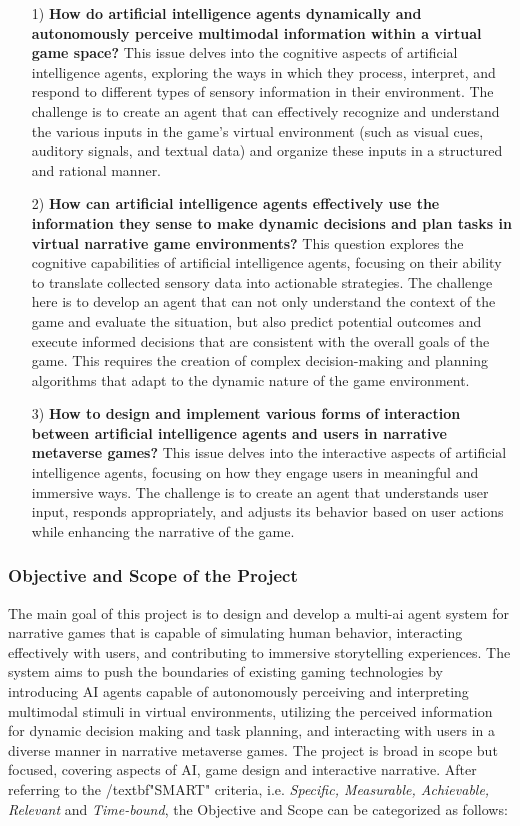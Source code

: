 \begin{itemize}
    \item [1)] 
    \textbf{How do artificial intelligence agents dynamically and autonomously perceive multimodal information within a virtual game space?} 
    This issue delves into the cognitive aspects of artificial intelligence agents, exploring the ways in which they process, interpret, and respond to different types of sensory information in their environment. The challenge is to create an agent that can effectively recognize and understand the various inputs in the game's virtual environment (such as visual cues, auditory signals, and textual data) and organize these inputs in a structured and rational manner.
    \item [2)]
    \textbf{How can artificial intelligence agents effectively use the information they sense to make dynamic decisions and plan tasks in virtual narrative game environments?} 
    This question explores the cognitive capabilities of artificial intelligence agents, focusing on their ability to translate collected sensory data into actionable strategies. The challenge here is to develop an agent that can not only understand the context of the game and evaluate the situation, but also predict potential outcomes and execute informed decisions that are consistent with the overall goals of the game. 
    This requires the creation of complex decision-making and planning algorithms that adapt to the dynamic nature of the game environment.
    \item [3)]
    \textbf{How to design and implement various forms of interaction between artificial intelligence agents and users in narrative metaverse games?} 
    This issue delves into the interactive aspects of artificial intelligence agents, focusing on how they engage users in meaningful and immersive ways. The challenge is to create an agent that understands user input, responds appropriately, and adjusts its behavior based on user actions while enhancing the narrative of the game.
\end{itemize}

\subsubsection{Objective and Scope of the Project}
The main goal of this project is to design and develop a multi-ai agent system for narrative games that is capable of simulating human behavior, interacting effectively with users, and contributing to immersive storytelling experiences. 
The system aims to push the boundaries of existing gaming technologies by introducing AI agents capable of autonomously perceiving and interpreting multimodal stimuli in virtual environments, utilizing the perceived information for dynamic decision making and task planning, 
and interacting with users in a diverse manner in narrative metaverse games. 
The project is broad in scope but focused, covering aspects of AI, game design and interactive narrative. 
After referring to the /textbf{"SMART"} criteria, i.e. \textit{Specific, Measurable, Achievable, Relevant} and \textit{Time-bound}, the Objective and Scope can be categorized as follows:

